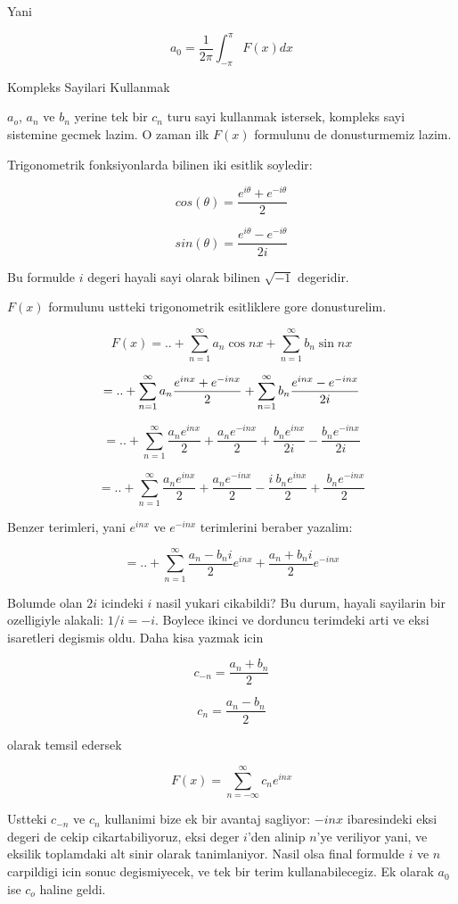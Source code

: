 \documentclass[12pt,fleqn]{article}\usepackage{../common}
\begin{document}
Yani

\[ a_0 = \frac{1}{2\pi}\int_{-\pi}^{\pi}F(x)dx \]

Kompleks Sayilari Kullanmak

$a_o$, $a_n$ ve $b_n$ yerine tek bir $c_n$ turu sayi kullanmak istersek,
kompleks sayi sistemine gecmek lazim. O zaman ilk $F(x)$ formulunu de
donusturmemiz lazim.

Trigonometrik fonksiyonlarda bilinen iki esitlik soyledir:

\[ cos(\theta) = \frac{e^{i\theta}+e^{-i\theta}}{2} \]

\[ sin(\theta) = \frac{e^{i\theta}-e^{-i\theta}}{2i}  \]

Bu formulde $i$ degeri hayali sayi olarak bilinen $\sqrt{-1}$ degeridir. 

$F(x)$ formulunu ustteki trigonometrik esitliklere gore donusturelim. 

\[ F(x) = .. +  \sum_{n=1}^{\infty}a_n \cos nx + \sum_{n=1}^{\infty}b_n \sin nx \]

\[ = .. + \sum_{n=1}^{\infty} a_n \frac{e^{inx} + e^{-inx}}{2} +  \sum_{n=1}^{\infty} b_n \frac{e^{inx} - e^{-inx}}{2i}\\ \]

\[ = .. + \sum_{n=1}^{\infty} \frac{a_ne^{inx}}{2} + \frac{a_ne^{-inx}}{2} +
\frac{b_ne^{inx}}{2i} - \frac{b_ne^{-inx}}{2i} \]

\[ = .. + \sum_{n=1}^{\infty} \frac{a_ne^{inx}}{2} + \frac{a_ne^{-inx}}{2} -
\frac{i \ b_ne^{inx}}{2} + \frac{ \ b_ne^{-inx}}{2} \]

Benzer terimleri, yani $e^{inx}$ ve $e^{-inx}$ terimlerini beraber yazalim:

\[ = .. + \sum_{n=1}^{\infty} \frac{a_n-b_ni}{2}e^{inx} + \frac{a_n+b_ni}{2}e^{-inx} \]

Bolumde olan $2i$ icindeki $i$ nasil yukari cikabildi? Bu durum, hayali
sayilarin bir ozelligiyle alakali: $1/i = -i$. Boylece ikinci ve dorduncu
terimdeki arti ve eksi isaretleri degismis oldu. Daha kisa yazmak icin

\[ c_{-n} = \frac{a_n + b_n}{2} \]

\[ c_{n} = \frac{a_n - b_n}{2} \]

olarak temsil edersek

\begin{equation} F(x) = \sum_{n=-\infty}^{\infty} c_ne^{inx} \label{complexfourier} \end{equation}

Ustteki $c_{-n}$ ve $c_n$ kullanimi bize ek bir avantaj sagliyor: $-inx$
ibaresindeki eksi degeri de cekip cikartabiliyoruz, eksi deger $i$'den alinip
$n$'ye veriliyor yani, ve eksilik toplamdaki alt sinir olarak
tanimlaniyor. Nasil olsa final formulde $i$ ve $n$ carpildigi icin sonuc
degismiyecek, ve tek bir terim kullanabilecegiz. Ek olarak $a_0$ ise $c_o$
haline geldi.
\end{document}
